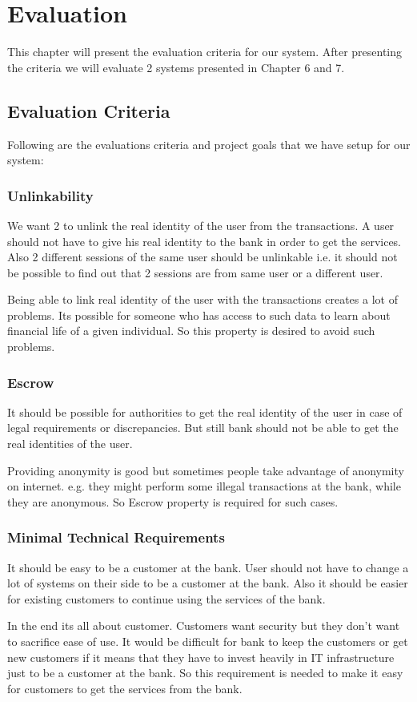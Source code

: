 \chapter{Evaluation}
This chapter will present the evaluation criteria for our system. After presenting the criteria we will evaluate 2 systems presented in Chapter 6 and 7.
\section{Evaluation Criteria}
Following are the evaluations criteria and project goals that we have setup for our system:
\subsection{Unlinkability}
We want 2 to unlink the real identity of the user from the transactions. A user should not have to give his real identity to the bank in order to get the services. Also 2 different sessions of the same user should be unlinkable i.e. it should not be possible to find out that 2 sessions are from same user or a different user.

Being able to link real identity of the user with the transactions creates a lot of problems. Its possible for someone who has access to such data to learn about financial life of a given individual. So this property is desired to avoid such problems.
\subsection{Escrow}
It should be possible for authorities to get the real identity of the user in case of legal requirements or discrepancies. But still bank should not be able to get the real identities of the user.

Providing anonymity is good but sometimes people take advantage of anonymity on internet. e.g. they might perform some illegal transactions at the bank, while they are anonymous. So Escrow property is required for such cases.
\subsection{Minimal Technical Requirements}
It should be easy to be a customer at the bank. User should not have to change a lot of systems on their side to be a customer at the bank. Also it should be easier for existing customers to continue using the services of the bank.

In the end its all about customer. Customers want security but they don't want to sacrifice ease of use. It would be difficult for bank to keep the customers or get new customers if it means that they have to invest heavily in IT infrastructure just to be a customer at the bank. So this requirement is needed to make it easy for customers to get the services from the bank.
